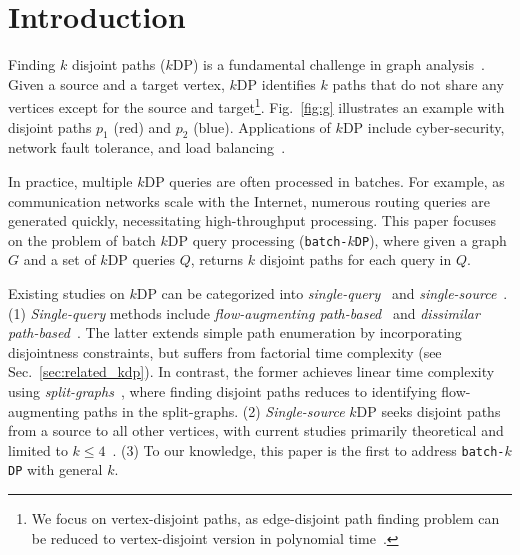 \section{Introduction}\label{sec:introduction}
Finding $k$ disjoint paths ($k$DP) is a fundamental challenge in graph analysis~\cite{baseline_moreverbose,baselineOnlySplitP1,baseline1step2, Penalty,dissimilarity_topk1,SCB}. 
Given a source and a target vertex, $k$DP identifies $k$ paths that do not share any vertices except for the source and target\footnote{We focus on vertex-disjoint paths, as edge-disjoint path finding problem can be reduced to vertex-disjoint version in polynomial time~\cite{edgedisjoint2vertexdisjoint}.}. 
Fig.~\ref{fig:g} illustrates an example with disjoint paths $p_1$ (red) and $p_2$ (blue).
Applications of $k$DP include cyber-security, network fault tolerance, and load balancing~\cite{2009BRTree,cyber_secure, Penalty,dissimilarity_topk1,SCB}.

In practice, multiple $k$DP queries are often processed in batches. 
For example, as communication networks scale with the Internet, numerous routing queries are generated quickly, necessitating high-throughput processing.
This paper focuses on the problem of batch $k$DP query processing (\texttt{batch-$k$DP}), where given a graph $G$ and a set of $k$DP queries $Q$, returns $k$ disjoint paths for each query in $Q$.

Existing studies on $k$DP can be categorized into \emph{single-query}~\cite{baseline_moreverbose,baselineOnlySplitP1,baseline1step2,Penalty,dissimilarity_topk1,SCB} and \emph{single-source}~\cite{2009BRTree,four_independent_spanning,IST_survey}. 
(1) \emph{Single-query} methods include \emph{flow-augmenting path-based}~\cite{baseline_moreverbose,baselineOnlySplitP1,baseline1step2} and \emph{dissimilar path-based}~\cite{Penalty,dissimilarity_topk1,SCB}. 
The latter extends simple path enumeration by incorporating disjointness constraints, but suffers from factorial time complexity (see Sec.~\ref{sec:related_kdp}).
In contrast, the former achieves linear time complexity using \emph{split-graphs}~\cite{baseline_moreverbose,baseline1step2,baselineOnlySplitP1}, where finding disjoint paths reduces to identifying flow-augmenting paths in the split-graphs. 
(2) \emph{Single-source} $k$DP seeks disjoint paths from a source to all other vertices, with current studies primarily theoretical and limited to $k \leq 4$~\cite{IST_survey}. 
(3) To our knowledge, this paper is the first to address \texttt{batch-$k$DP} with general $k$.

